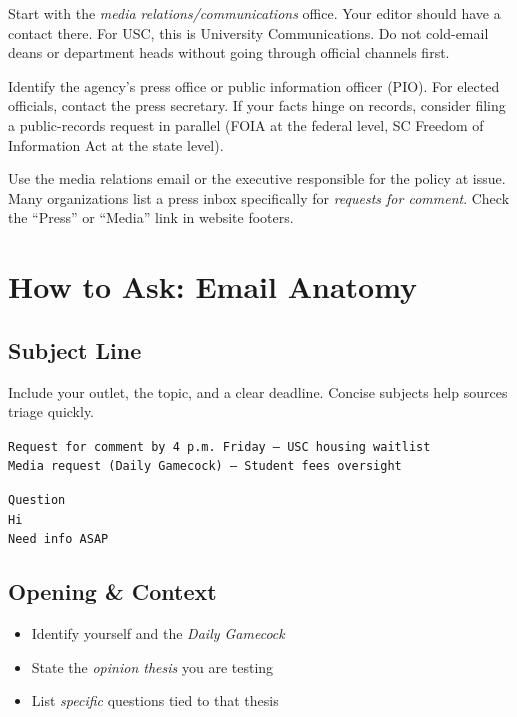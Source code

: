\documentclass[12pt]{article}
\begin{document}
\begin{exampleblock}[Universities]
Start with the \emph{media relations/communications} office. Your editor should have a contact there. For USC, this is University Communications. Do not cold-email deans or department heads without going through official channels first.
\end{exampleblock}

\begin{exampleblock}
Identify the agency's press office or public information officer (PIO). For elected officials, contact the press secretary. If your facts hinge on records, consider filing a public-records request in parallel (FOIA at the federal level, SC Freedom of Information Act at the state level).
\end{exampleblock}

\begin{exampleblock}
Use the media relations email or the executive responsible for the policy at issue. Many organizations list a press inbox specifically for \emph{requests for comment}. Check the ``Press'' or ``Media'' link in website footers.
\end{exampleblock}

\section{How to Ask: Email Anatomy}

\subsection*{Subject Line}
Include your outlet, the topic, and a clear deadline. Concise subjects help sources triage quickly.

\begin{goodbox}
\texttt{Request for comment by 4 p.m. Friday --- USC housing waitlist}\\
\texttt{Media request (Daily Gamecock) --- Student fees oversight}
\end{goodbox}

\begin{badbox}
\texttt{Question}\\
\texttt{Hi}\\
\texttt{Need info ASAP}
\end{badbox}

\subsection*{Opening \& Context}
\begin{itemize}
  \item Identify yourself and the \emph{Daily Gamecock}
  \item State the \emph{opinion thesis} you are testing
  \item List \emph{specific} questions tied to that thesis
\end{itemize}
\end{document}
